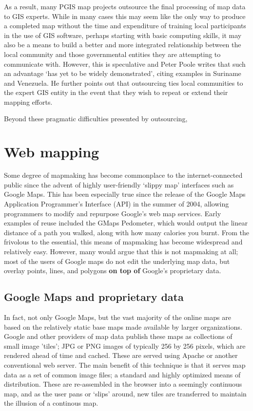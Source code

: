 \documentclass[11pt]{report}
\begin{document}
As a result, many PGIS map projects outsource the final processing of map data to GIS experts. While in many cases this may seem like the only way to produce a completed map without the time and expenditure of training local participants in the use of GIS software, perhaps starting with basic computing skills, it may also be a means to build a better and more integrated relationship between the local community and those governmental entities they are attempting to communicate with. However, this is speculative and Peter Poole writes that such an advantage `has yet to be widely demonstrated', citing examples in Suriname and Venezuela. He further points out that outsourcing ties local communities to the expert GIS entity in the event that they wish to repeat or extend their mapping efforts. \cite{poole2006there}

Beyond these pragmatic difficulties presented by outsourcing,  

\section{Web mapping}
\label{sec:webmapping}
Some degree of mapmaking has become commonplace to the internet-connected public since the advent of highly user-friendly `slippy map' interfaces such as Google Maps. This has been especially true since the release of the Google Maps Application Programmer's Interface (API) in the summer of 2004, allowing programmers to modify and repurpose Google's web map services.  Early examples of reuse included the GMaps Pedometer, which would output the linear distance of a path you walked, along with how many calories you burnt. \cite{gibson2006google} From the frivolous to the essential, this means of mapmaking has become widespread and relatively easy. However, many would argue that this is not mapmaking at all; most of the users of Google maps do not edit the underlying map data, but overlay points, lines, and polygons \textbf{on top of} Google's proprietary data.

\subsection{Google Maps and proprietary data}

In fact, not only Google Maps, but the vast majority of the online maps are based on the relatively static base maps made available by larger organizations. Google and other providers of map data publish these maps as collections of small image 'tiles'; JPG or PNG images of typically 256 by 256 pixels, which are rendered ahead of time and cached. These are served using Apache or another conventional web server. The main benefit of this technique is that it serves map data as a set of common image files; a standard and highly optimized means of distribution. These are re-assembled in the browser into a seemingly continuous map, and as the user pans or `slips' around, new tiles are transferred to maintain the illusion of a continous map.
\end{document}
